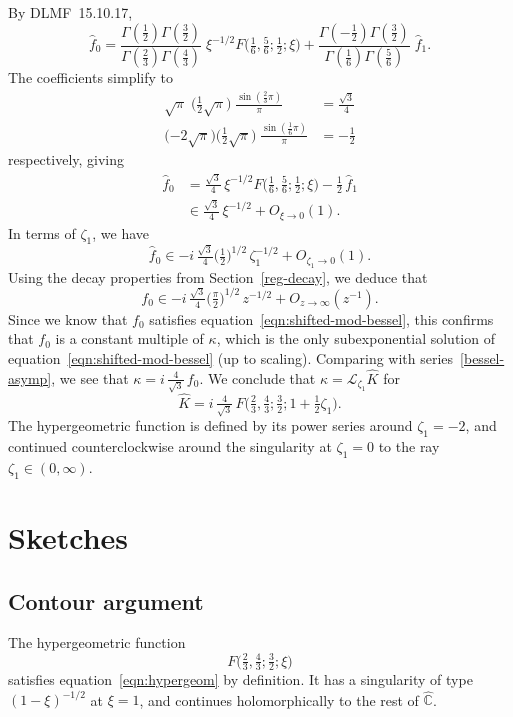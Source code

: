 \documentclass{article}
\newcommand{\C}{\mathbb{C}}
\newcommand{\laplace}{\mathcal{L}}
\begin{document}
By DLMF~15.10.17,
\[ \hat{f}_0 = \frac{\Gamma(\tfrac{1}{2}) \Gamma(\tfrac{3}{2})}{\Gamma(\tfrac{2}{3}) \Gamma(\tfrac{4}{3})}\;\xi^{-1/2} F\big(\tfrac{1}{6}, \tfrac{5}{6}; \tfrac{1}{2}; \xi\big) + \frac{\Gamma(-\tfrac{1}{2}) \Gamma(\tfrac{3}{2})}{\Gamma(\tfrac{1}{6}) \Gamma(\tfrac{5}{6})}\;\hat{f}_1. \]
The coefficients simplify to
\begin{align*}
\sqrt{\pi}\;\big(\tfrac{1}{2}\sqrt{\pi}\big)\;\frac{\sin(\tfrac{2}{3} \pi)}{\pi} & = \frac{\sqrt{3}}{4} \\
\big({-2}\sqrt{\pi}\big) \big(\tfrac{1}{2}\sqrt{\pi}\big)\;\frac{\sin(\tfrac{1}{6} \pi)}{\pi} & = -\frac{1}{2}
\end{align*}
respectively, giving
\begin{align*}
\hat{f}_0 & = \tfrac{\sqrt{3}}{4}\,\xi^{-1/2} F\big(\tfrac{1}{6}, \tfrac{5}{6}; \tfrac{1}{2}; \xi\big) - \tfrac{1}{2}\,\hat{f}_1 \\
& \in \tfrac{\sqrt{3}}{4}\,\xi^{-1/2} + O_{\xi \to 0}(1).
\end{align*}
In terms of $\zeta_1$, we have
\[ \hat{f}_0 \in -i\,\tfrac{\sqrt{3}}{4} \big(\tfrac{1}{2}\big)^{1/2}\,\zeta_1^{-1/2} + O_{\zeta_1 \to 0}(1). \]
Using the decay properties from Section~\ref{reg-decay}, we deduce that
\[ f_0 \in -i\,\tfrac{\sqrt{3}}{4} \big(\tfrac{\pi}{2}\big)^{1/2}\,z^{-1/2} + O_{z \to \infty}(z^{-1}). \]
Since we know that $f_0$ satisfies equation~\ref{eqn:shifted-mod-bessel}, this confirms that $f_0$ is a constant multiple of $\kappa$, which is the only subexponential solution of equation~\ref{eqn:shifted-mod-bessel} (up to scaling). Comparing with series~\ref{bessel-asymp}, we see that $\kappa = i\,\tfrac{4}{\sqrt{3}}\,f_0$. We conclude that $\kappa = \laplace_{\zeta_1} \hat{K}$ for
\[ \hat{K} = i\,\tfrac{4}{\sqrt{3}}\,F\big(\tfrac{2}{3}, \tfrac{4}{3}; \tfrac{3}{2}; 1 + \tfrac{1}{2}\zeta_1\big). \]
The hypergeometric function is defined by its power series around $\zeta_1 = -2$, and continued counterclockwise around the singularity at $\zeta_1 = 0$ to the ray $\zeta_1 \in (0, \infty)$.
\section{Sketches}
\subsection{Contour argument}
The hypergeometric function
\[ F\big(\tfrac{2}{3}, \tfrac{4}{3}; \tfrac{3}{2}; \xi\big) \]
satisfies equation~\ref{eqn:hypergeom} by definition. It has a singularity of type $(1 - \xi)^{-1/2}$ at $\xi = 1$, and continues holomorphically to the rest of $\hat{\C}$.
\end{document}
